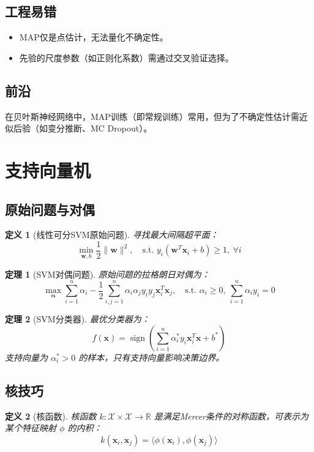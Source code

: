 \documentclass[UTF8, 10pt]{ctexart}
\newtheorem{theorem}{定理}[section]
\newtheorem{definition}{定义}[section]
\newcommand{\R}{\mathbb{R}}
\begin{document}
\subsection{工程易错}
\begin{itemize}
    \item MAP仅是点估计，无法量化不确定性。
    \item 先验的尺度参数（如正则化系数）需通过交叉验证选择。
\end{itemize}

\subsection{前沿}
在贝叶斯神经网络中，MAP训练（即常规训练）常用，但为了不确定性估计需近似后验（如变分推断、MC Dropout）。

\section{支持向量机}
\subsection{原始问题与对偶}
\begin{definition}[线性可分SVM原始问题]
寻找最大间隔超平面：
\[
\min_{\bm{w},b} \frac{1}{2}\|\bm{w}\|^2,\quad \text{s.t. } y_i(\bm{w}^T\bm{x}_i + b) \ge 1,\ \forall i
\]
\end{definition}

\begin{theorem}[SVM对偶问题]
原始问题的拉格朗日对偶为：
\[
\max_{\bm{\alpha}} \sum_{i=1}^{n} \alpha_i - \frac{1}{2}\sum_{i,j=1}^{n} \alpha_i \alpha_j y_i y_j \bm{x}_i^T \bm{x}_j,\quad \text{s.t. } \alpha_i \ge 0,\ \sum_{i=1}^{n} \alpha_i y_i = 0
\]
\end{theorem}

\begin{theorem}[SVM分类器]
最优分类器为：
\[
f(\bm{x}) = \operatorname{sign}\left(\sum_{i=1}^{n} \alpha_i^* y_i \bm{x}_i^T \bm{x} + b^*\right)
\]
支持向量为 $\alpha_i^* > 0$ 的样本，只有支持向量影响决策边界。
\end{theorem}

\subsection{核技巧}
\begin{definition}[核函数]
核函数 $k: \mathcal{X} \times \mathcal{X} \to \R$ 是满足Mercer条件的对称函数，可表示为某个特征映射 $\phi$ 的内积：
\[
k(\bm{x}_i, \bm{x}_j) = \langle \phi(\bm{x}_i), \phi(\bm{x}_j) \rangle
\]
\end{definition}
\end{document}
